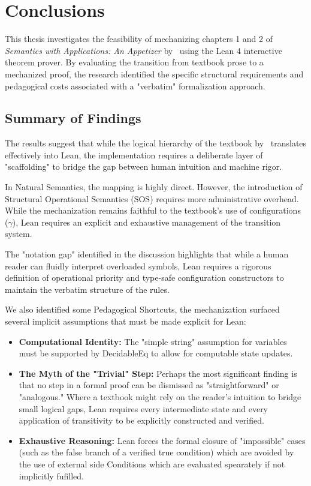 

%
%
%
%
%
%
\chapter{Conclusions}
This thesis investigates the feasibility of mechanizing chapters 1 and 2 of
\emph{Semantics with Applications: An Appetizer} by~\cite{nielson_semantics_2007}
using the Lean 4 interactive theorem prover.
By evaluating the transition from textbook prose to a mechanized proof,
the research identified the specific structural requirements and pedagogical
costs associated with a "verbatim" formalization approach.

\section{Summary of Findings}
The results suggest that while
the logical hierarchy of the textbook by~\cite{nielson_semantics_2007} translates effectively into Lean,
the implementation requires a deliberate layer of "scaffolding"
to bridge the gap between human intuition and machine rigor.

In Natural Semantics, the mapping is highly direct.
However, the introduction of Structural Operational Semantics (SOS)
requires more administrative overhead.
While the mechanization remains faithful to the textbook's use of
configurations ($\gamma$), Lean requires an explicit and exhaustive
management of the transition system.

The "notation gap" identified in the discussion highlights that while
a human reader can fluidly interpret overloaded symbols,
Lean requires a rigorous definition of operational
priority and type-safe configuration constructors to maintain the
verbatim structure of the rules.

We also identified some Pedagogical Shortcuts,
the mechanization surfaced several implicit assumptions that must be
made explicit for Lean:
\begin{itemize}
    \item \textbf{Computational Identity:}
    The "simple string" assumption for variables must be
    supported by DecidableEq to allow for computable state updates.

    \item \textbf{The Myth of the "Trivial" Step:}
    Perhaps the most significant finding is that no step in a
    formal proof can be dismissed as "straightforward" or "analogous."
    Where a textbook might rely on the reader's intuition to bridge
    small logical gaps, Lean requires every intermediate state and every
    application of transitivity to be explicitly constructed and verified.

    \item \textbf{Exhaustive Reasoning:}
    Lean forces the formal closure of "impossible" cases
    (such as the false branch of a verified true condition)
    which are avoided by the use of external side Conditions
    which are evaluated spearately if not implicitly fufilled.
\end{itemize}



